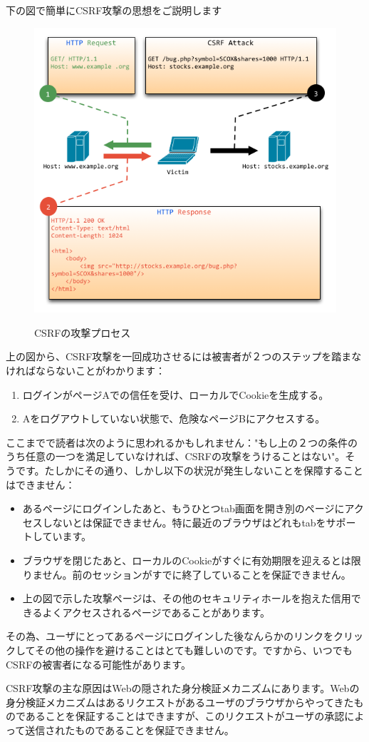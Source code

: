 下の図で簡単にCSRF攻撃の思想をご説明します

\begin{figure}[H]
   \includegraphics[width=14cm]{9.1.csrf.png}
   \label{図9.1}
   \caption{CSRFの攻撃プロセス}
\end{figure}


上の図から、CSRF攻撃を一回成功させるには被害者が２つのステップを踏まなければならないことがわかります：

\begin{enumerate}
  \item ログインがページAでの信任を受け、ローカルでCookieを生成する。
  \item Aをログアウトしていない状態で、危険なページBにアクセスする。
\end{enumerate}

ここまでで読者は次のように思われるかもしれません："もし上の２つの条件のうち任意の一つを満足していなければ、CSRFの攻撃をうけることはない"。そうです。たしかにその通り、しかし以下の状況が発生しないことを保障することはできません：

\begin{itemize}
  \item あるページにログインしたあと、もうひとつtab画面を開き別のページにアクセスしないとは保証できません。特に最近のブラウザはどれもtabをサポートしています。
  \item ブラウザを閉じたあと、ローカルのCookieがすぐに有効期限を迎えるとは限りません。前のセッションがすでに終了していることを保証できません。
  \item 上の図で示した攻撃ページは、その他のセキュリティホールを抱えた信用できるよくアクセスされるページであることがあります。
\end{itemize}

その為、ユーザにとってあるページにログインした後なんらかのリンクをクリックしてその他の操作を避けることはとても難しいのです。ですから、いつでもCSRFの被害者になる可能性があります。

CSRF攻撃の主な原因はWebの隠された身分検証メカニズムにあります。Webの身分検証メカニズムはあるリクエストがあるユーザのブラウザからやってきたものであることを保証することはできますが、このリクエストがユーザの承認によって送信されたものであることを保証できません。
